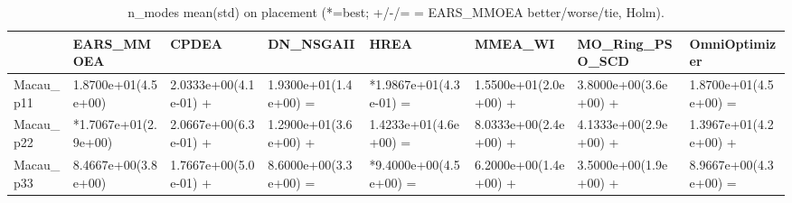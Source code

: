 \begin{table}[t]
\centering
\caption{n_modes mean(std) on placement (*=best; +/-/= = EARS_MMOEA better/worse/tie, Holm).}
\label{tab:placement_n_modes}
\begin{tabular}{llllllll}
\toprule
 & EARS\_MMOEA & CPDEA & DN\_NSGAII & HREA & MMEA\_WI & MO\_Ring\_PSO\_SCD & OmniOptimizer \\
\midrule
Macau\_p11 & 1.8700e+01(4.5e+00) & 2.0333e+00(4.1e-01) + & 1.9300e+01(1.4e+00) = & *1.9867e+01(4.3e-01) = & 1.5500e+01(2.0e+00) + & 3.8000e+00(3.6e+00) + & 1.8700e+01(4.5e+00) = \\
Macau\_p22 & *1.7067e+01(2.9e+00) & 2.0667e+00(6.3e-01) + & 1.2900e+01(3.6e+00) + & 1.4233e+01(4.6e+00) = & 8.0333e+00(2.4e+00) + & 4.1333e+00(2.9e+00) + & 1.3967e+01(4.2e+00) + \\
Macau\_p33 & 8.4667e+00(3.8e+00) & 1.7667e+00(5.0e-01) + & 8.6000e+00(3.3e+00) = & *9.4000e+00(4.5e+00) = & 6.2000e+00(1.4e+00) + & 3.5000e+00(1.9e+00) + & 8.9667e+00(4.3e+00) = \\
\bottomrule
\end{tabular}
\end{table}

